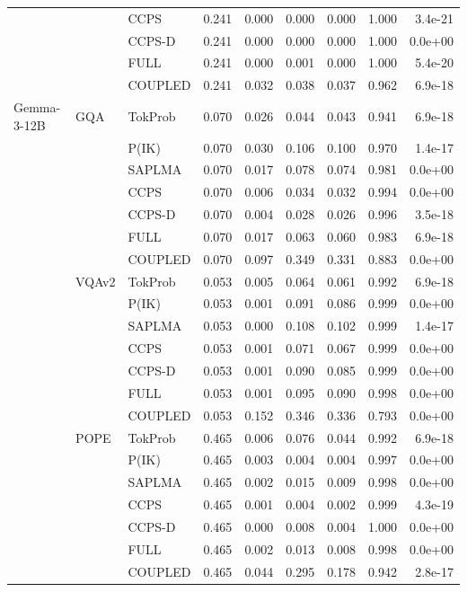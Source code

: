 \begin{longtable}{
>{\small}l
>{\small}l
>{\small}l
>{\small}r
>{\small}r
>{\small}r
>{\small}r
>{\small}r
>{\small}r
}
 &  & CCPS & 0.241 & 0.000 & 0.000 & 0.000 & 1.000 & 3.4e-21 \\
 &  & CCPS-D & 0.241 & 0.000 & 0.000 & 0.000 & 1.000 & 0.0e+00 \\
 &  & FULL & 0.241 & 0.000 & 0.001 & 0.000 & 1.000 & 5.4e-20 \\
 &  & COUPLED & 0.241 & 0.032 & 0.038 & 0.037 & 0.962 & 6.9e-18 \\
\midrule
Gemma-3-12B & GQA & TokProb & 0.070 & 0.026 & 0.044 & 0.043 & 0.941 & 6.9e-18 \\
 &  & P(IK) & 0.070 & 0.030 & 0.106 & 0.100 & 0.970 & 1.4e-17 \\
 &  & SAPLMA & 0.070 & 0.017 & 0.078 & 0.074 & 0.981 & 0.0e+00 \\
 &  & CCPS & 0.070 & 0.006 & 0.034 & 0.032 & 0.994 & 0.0e+00 \\
 &  & CCPS-D & 0.070 & 0.004 & 0.028 & 0.026 & 0.996 & 3.5e-18 \\
 &  & FULL & 0.070 & 0.017 & 0.063 & 0.060 & 0.983 & 6.9e-18 \\
 &  & COUPLED & 0.070 & 0.097 & 0.349 & 0.331 & 0.883 & 0.0e+00 \\
\addlinespace
 & VQAv2 & TokProb & 0.053 & 0.005 & 0.064 & 0.061 & 0.992 & 6.9e-18 \\
 &  & P(IK) & 0.053 & 0.001 & 0.091 & 0.086 & 0.999 & 0.0e+00 \\
 &  & SAPLMA & 0.053 & 0.000 & 0.108 & 0.102 & 0.999 & 1.4e-17 \\
 &  & CCPS & 0.053 & 0.001 & 0.071 & 0.067 & 0.999 & 0.0e+00 \\
 &  & CCPS-D & 0.053 & 0.001 & 0.090 & 0.085 & 0.999 & 0.0e+00 \\
 &  & FULL & 0.053 & 0.001 & 0.095 & 0.090 & 0.998 & 0.0e+00 \\
 &  & COUPLED & 0.053 & 0.152 & 0.346 & 0.336 & 0.793 & 0.0e+00 \\
\addlinespace
 & POPE & TokProb & 0.465 & 0.006 & 0.076 & 0.044 & 0.992 & 6.9e-18 \\
 &  & P(IK) & 0.465 & 0.003 & 0.004 & 0.004 & 0.997 & 0.0e+00 \\
 &  & SAPLMA & 0.465 & 0.002 & 0.015 & 0.009 & 0.998 & 0.0e+00 \\
 &  & CCPS & 0.465 & 0.001 & 0.004 & 0.002 & 0.999 & 4.3e-19 \\
 &  & CCPS-D & 0.465 & 0.000 & 0.008 & 0.004 & 1.000 & 0.0e+00 \\
 &  & FULL & 0.465 & 0.002 & 0.013 & 0.008 & 0.998 & 0.0e+00 \\
 &  & COUPLED & 0.465 & 0.044 & 0.295 & 0.178 & 0.942 & 2.8e-17 \\
\end{longtable}
